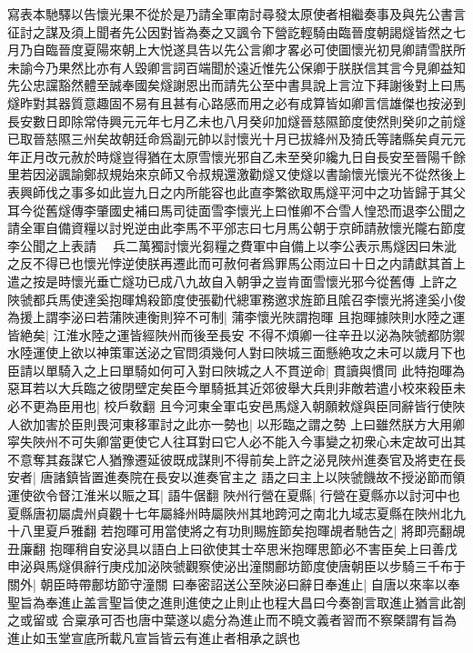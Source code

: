 {寫表本馳驛以告懷光果不從於是乃請全軍南討尋發太原使者相繼奏事及與先公書言征討之謀及須上聞者先公因對皆為奏之又諷令下營訖輕騎由臨晉度朝謁燧皆然之七月乃自臨晉度夏陽來朝上大悦遂具告以先公言卿才畧必可使圖懷光初見卿請雪朕所未諭今乃果然比亦有人毀卿言詞百端聞於遠近惟先公保卿于朕朕信其言今見卿益知先公忠讜豁然體至誠奉國矣燧謝恩出而請先公至中書具說上言泣下拜謝後對上曰馬燧昨對其器質意趣固不易有且甚有心路感而用之必有成算皆如卿言信雄傑也按泌到長安數日即除常侍興元元年七月乙未也八月癸卯加燧晉慈隰節度使然則癸卯之前燧已取晉慈隰三州矣故朝廷命爲副元帥以討懷光十月已拔絳州及猗氏等諸縣矣貞元元年正月改元赦於時燧豈得猶在太原雪懷光邪自乙未至癸卯纔九日自長安至晉陽千餘里若因泌諷諭鄭叔規始來京師又令叔規還激勸燧又使燧以書諭懷光懷光不從然後上表興師伐之事多如此豈九日之内所能容也此直李繁欲取馬燧平河中之功皆歸于其父耳今從舊燧傳李肇國史補曰馬司徒面雪李懷光上曰惟卿不合雪人惶恐而退李公聞之請全軍自備資糧以討兇逆由此李馬不平邠志曰七月馬公朝于京師請赦懷光隴右節度李公聞之上表請　兵二萬獨討懷光芻糧之費軍中自備上以李公表示馬燧因曰朱泚之反不得已也懷光悖逆使朕再遷此而可赦何者爲罪馬公雨泣曰十日之内請獻其首上遣之按是時懷光垂亡燧功已成八九故自入朝爭之豈肯面雪懷光邪今從舊傳}
上許之　陜虢都兵馬使達奚抱暉鴆殺節度使張勸代總軍務邀求旌節且隂召李懷光將達奚小俊為援上謂李泌曰若蒲陜連衡則猝不可制|{
	蒲李懷光陜謂抱暉}
且抱暉據陜則水陸之運皆絶矣|{
	江淮水陸之運皆經陜州而後至長安}
不得不煩卿一往辛丑以泌為陜虢都防禦水陸運使上欲以神策軍送泌之官問須幾何人對曰陜城三面懸絶攻之未可以歲月下也臣請以單騎入之上曰單騎如何可入對曰陜城之人不貫逆命|{
	貫讀與慣同}
此特抱暉為惡耳若以大兵臨之彼閉壁定矣臣今單騎抵其近郊彼舉大兵則非敵若遣小校來殺臣未必不更為臣用也|{
	校戶敎翻}
且今河東全軍屯安邑馬燧入朝願敕燧與臣同辭皆行使陜人欲加害於臣則畏河東移軍討之此亦一勢也|{
	以形臨之謂之勢}
上曰雖然朕方大用卿寜失陜州不可失卿當更使它人往耳對曰它人必不能入今事變之初衆心未定故可出其不意奪其姦謀它人猶豫遷延彼既成謀則不得前矣上許之泌見陜州進奏官及將吏在長安者|{
	唐諸鎮皆置進奏院在長安以進奏官主之}
語之曰主上以陜虢饑故不授泌節而領運使欲令督江淮米以賑之耳|{
	語牛倨翻}
陜州行營在夏縣|{
	行營在夏縣亦以討河中也夏縣唐初屬虞州貞觀十七年屬絳州時屬陜州其地跨河之南北九域志夏縣在陜州北九十八里夏戶雅翻}
若抱暉可用當使將之有功則賜旌節矣抱暉覘者馳告之|{
	將即亮翻覘丑廉翻}
抱暉稍自安泌具以語白上曰欲使其士卒思米抱暉思節必不害臣矣上曰善戊申泌與馬燧俱辭行庚戍加泌陜虢觀察使泌出潼關鄜坊節度使唐朝臣以步騎三千布于關外|{
	朝臣時帶鄜坊節守潼關}
曰奉密詔送公至陜泌曰辭日奉進止|{
	自唐以來率以奉聖旨為奉進止盖言聖旨使之進則進使之止則止也程大昌曰今奏劄言取進止猶言此劄之或留或合稟承可否也唐中葉遂以處分為進止而不曉文義者習而不察槩謂有旨為進止如玉堂宣底所載凡宣旨皆云有進止者相承之誤也}
